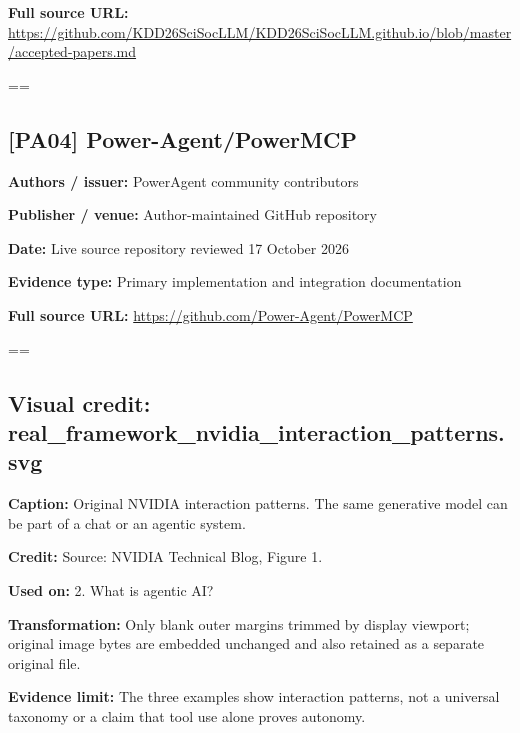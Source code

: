 \documentclass[10pt,letterpaper]{article}
\begin{document}
\textbf{Full source URL:} \href{https://github.com/KDD26SciSocLLM/KDD26SciSocLLM.github.io/blob/master/accepted-papers.md}{\small\ttfamily https:/\allowbreak{}/\allowbreak{}github.\allowbreak{}com/\allowbreak{}KDD26SciSocLLM/\allowbreak{}KDD26SciSocLLM.\allowbreak{}github.\allowbreak{}io/\allowbreak{}blob/\allowbreak{}master/\allowbreak{}accepted-\allowbreak{}papers.\allowbreak{}md}\par
\egroup\par\noindent\box\readingEntry\par\medskip
\setbox\readingEntry=\vbox\bgroup\hsize=\linewidth\subsection*{[PA04] Power-Agent/PowerMCP}
\textbf{Authors / issuer:} PowerAgent community contributors\par
\textbf{Publisher / venue:} Author-maintained GitHub repository\par
\textbf{Date:} Live source repository reviewed 17 October 2026\par
\textbf{Evidence type:} Primary implementation and integration documentation\par
\textbf{Full source URL:} \href{https://github.com/Power-Agent/PowerMCP}{\small\ttfamily https:/\allowbreak{}/\allowbreak{}github.\allowbreak{}com/\allowbreak{}Power-\allowbreak{}Agent/\allowbreak{}PowerMCP}\par
\egroup\par\noindent\box\readingEntry\par\medskip
\setbox\readingEntry=\vbox\bgroup\hsize=\linewidth\subsection*{Visual credit: real\_framework\_nvidia\_interaction\_patterns.svg}
\textbf{Caption:} Original NVIDIA interaction patterns. The same generative model can be part of a chat or an agentic system.\par
\textbf{Credit:} Source: NVIDIA Technical Blog, Figure 1.\par
\textbf{Used on:} 2. What is agentic AI?\par
\textbf{Transformation:} Only blank outer margins trimmed by display viewport; original image bytes are embedded unchanged and also retained as a separate original file.\par
\textbf{Evidence limit:} The three examples show interaction patterns, not a universal taxonomy or a claim that tool use alone proves autonomy.\par
\end{document}

